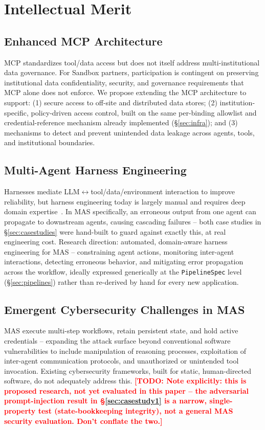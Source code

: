 \documentclass[10pt,conference]{IEEEtran}
\newcommand{\todo}[1]{\textcolor{red}{\textbf{[TODO: #1]}}}
\begin{document}
\section{Intellectual Merit}
\label{sec:merit}

\subsection{Enhanced MCP Architecture}
MCP standardizes tool/data access but does not itself address
multi-institutional data governance. For Sandbox partners, participation is
contingent on preserving institutional data confidentiality, security, and
governance requirements that MCP alone does not enforce. We propose
extending the MCP architecture to support: (1) secure access to off-site and
distributed data stores; (2) institution-specific, policy-driven access
control, built on the same per-binding allowlist and credential-reference
mechanism already implemented (\S\ref{sec:infra}); and (3) mechanisms to
detect and prevent unintended data leakage across agents, tools, and
institutional boundaries.

\subsection{Multi-Agent Harness Engineering}
Harnesses mediate LLM$\leftrightarrow$tool/data/environment interaction to
improve reliability, but harness engineering today is largely manual and
requires deep domain
expertise~\cite{lin2026agenticharnessengineeringobservabilitydriven}. In MAS
specifically, an erroneous output from one agent can propagate to downstream
agents, causing cascading failures -- both case studies in
\S\ref{sec:casestudies} were hand-built to guard against exactly this, at
real engineering cost. Research direction: automated, domain-aware harness
engineering for MAS -- constraining agent actions, monitoring inter-agent
interactions, detecting erroneous behavior, and mitigating error propagation
across the workflow, ideally expressed generically at the
\texttt{PipelineSpec} level (\S\ref{sec:pipelines}) rather than re-derived
by hand for every new application.

\subsection{Emergent Cybersecurity Challenges in MAS}
MAS execute multi-step workflows, retain persistent state, and hold active
credentials -- expanding the attack surface beyond conventional software
vulnerabilities to include manipulation of reasoning processes, exploitation
of inter-agent communication protocols, and unauthorized or unintended tool
invocation. Existing cybersecurity frameworks, built for static,
human-directed software, do not adequately address this. \todo{Note
explicitly: this is proposed research, not yet evaluated in this paper --
the adversarial prompt-injection result in \S\ref{sec:casestudy1} is a
narrow, single-property test (state-bookkeeping integrity), not a general
MAS security evaluation. Don't conflate the two.}
\end{document}
